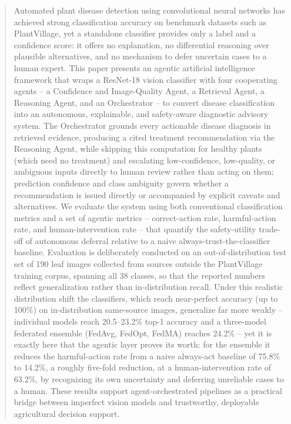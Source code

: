 \documentclass[conference]{IEEEtran}
\begin{document}
\begin{abstract}
Automated plant disease detection using convolutional neural networks has achieved strong classification accuracy on benchmark datasets such as PlantVillage, yet a standalone classifier provides only a label and a confidence score: it offers no explanation, no differential reasoning over plausible alternatives, and no mechanism to defer uncertain cases to a human expert. This paper presents an agentic artificial intelligence framework that wraps a ResNet-18 vision classifier with four cooperating agents -- a Confidence and Image-Quality Agent, a Retrieval Agent, a Reasoning Agent, and an Orchestrator -- to convert disease classification into an autonomous, explainable, and safety-aware diagnostic advisory system. The Orchestrator grounds every actionable disease diagnosis in retrieved evidence, producing a cited treatment recommendation via the Reasoning Agent, while skipping this computation for healthy plants (which need no treatment) and escalating low-confidence, low-quality, or ambiguous inputs directly to human review rather than acting on them; prediction confidence and class ambiguity govern whether a recommendation is issued directly or accompanied by explicit caveats and alternatives. We evaluate the system using both conventional classification metrics and a set of agentic metrics -- correct-action rate, harmful-action rate, and human-intervention rate -- that quantify the safety-utility trade-off of autonomous deferral relative to a naive always-trust-the-classifier baseline. Evaluation is deliberately conducted on an out-of-distribution test set of 190 leaf images collected from sources outside the PlantVillage training corpus, spanning all 38 classes, so that the reported numbers reflect generalization rather than in-distribution recall. Under this realistic distribution shift the classifiers, which reach near-perfect accuracy (up to 100\%) on in-distribution same-source images, generalize far more weakly -- individual models reach 20.5--23.2\% top-1 accuracy and a three-model federated ensemble (FedAvg, FedOpt, FedMA) reaches 24.2\% -- yet it is exactly here that the agentic layer proves its worth: for the ensemble it reduces the harmful-action rate from a naive always-act baseline of 75.8\% to 14.2\%, a roughly five-fold reduction, at a human-intervention rate of 63.2\%, by recognizing its own uncertainty and deferring unreliable cases to a human. These results support agent-orchestrated pipelines as a practical bridge between imperfect vision models and trustworthy, deployable agricultural decision support.
\end{abstract}
\end{document}
